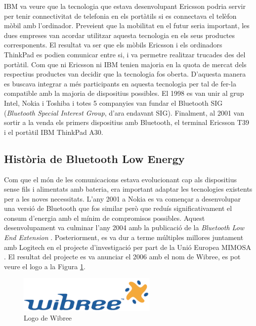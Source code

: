 IBM va veure que la tecnologia que estava desenvolupant Ericsson podria servir per tenir connectivitat de telefonia en els portàtils si es connectava el telèfon mòbil amb l'ordinador.
Preveient que la mobilitat en el futur seria important, les dues empreses van acordar utilitzar aquesta tecnologia en els seus productes corresponents.
El resultat va ser que els mòbils Ericsson i els ordinadors ThinkPad es podien comunicar entre si, i va permetre realitzar trucades des del portàtil.
Com que ni Ericsson ni IBM tenien majoria en la quota de mercat dels respectius productes van decidir que la tecnologia fos oberta.
D'aquesta manera es buscava integrar a més participants en aquesta tecnologia per tal de fer-la compatible amb la majoria de dispositius possibles.
El 1998 es van unir al grup Intel, Nokia i Toshiba i totes 5 companyies van fundar el Bluetooth SIG (\textit{Bluetooth Special Interest Group}, d'ara endavant SIG).
Finalment, al 2001 van sortir a la venda els primers dispositius amb Bluetooth, el terminal Ericsson T39 i el portàtil IBM ThinkPad A30.

\subsection{Història de Bluetooth Low Energy}
Com que el món de les comunicacions estava evolucionant cap als dispositius sense fils i alimentats amb bateria, era important adaptar les tecnologies existents per a les noves necessitats.
L'any 2001 a Nokia es va començar a desenvolupar una versió de Bluetooth que fos similar però que reduís significativament el consum d'energia amb el mínim de compromisos possibles.
Aquest desenvolupament va culminar l'any 2004 amb la publicació de la \textit{Bluetooth Low End Extension} \cite{Original_BLE_Extension}. 
Posteriorment, es va dur a terme múltiples millores juntament amb Logitech en el projecte d'investigació per part de la Unió Europea MIMOSA \cite{MIMOSA}.
El resultat del projecte es va anunciar el 2006 amb el nom de Wibree, es pot veure el logo a la Figura \ref{wibree_logo}.

\begin{figure}[hb]
	\begin{center}
		\includegraphics[width=0.6\textwidth]{./images/Wibree_Logo.png}
		\caption{Logo de Wibree}
		\label{wibree_logo}
	\end{center}
\end{figure}

